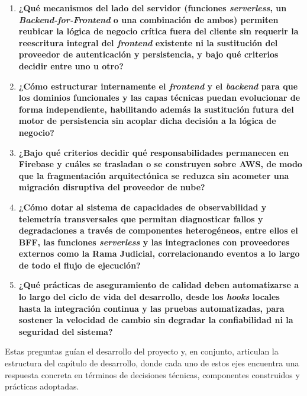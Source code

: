 \begin{enumerate}
  \item \textbf{¿Qué mecanismos del lado del servidor (funciones \textit{serverless}, un \textit{Backend-for-Frontend} o una combinación de ambos) permiten reubicar la lógica de negocio crítica fuera del cliente sin requerir la reescritura integral del \textit{frontend} existente ni la sustitución del proveedor de autenticación y persistencia, y bajo qué criterios decidir entre uno u otro?}

  \item \textbf{¿Cómo estructurar internamente el \textit{frontend} y el \textit{backend} para que los dominios funcionales y las capas técnicas puedan evolucionar de forma independiente, habilitando además la sustitución futura del motor de persistencia sin acoplar dicha decisión a la lógica de negocio?}

  \item \textbf{¿Bajo qué criterios decidir qué responsabilidades permanecen en Firebase y cuáles se trasladan o se construyen sobre AWS, de modo que la fragmentación arquitectónica se reduzca sin acometer una migración disruptiva del proveedor de nube?}

  \item \textbf{¿Cómo dotar al sistema de capacidades de observabilidad y telemetría transversales que permitan diagnosticar fallos y degradaciones a través de componentes heterogéneos, entre ellos el BFF, las funciones \textit{serverless} y las integraciones con proveedores externos como la Rama Judicial, correlacionando eventos a lo largo de todo el flujo de ejecución?}

  \item \textbf{¿Qué prácticas de aseguramiento de calidad deben automatizarse a lo largo del ciclo de vida del desarrollo, desde los \textit{hooks} locales hasta la integración continua y las pruebas automatizadas, para sostener la velocidad de cambio sin degradar la confiabilidad ni la seguridad del sistema?}
\end{enumerate}

Estas preguntas guían el desarrollo del proyecto y, en conjunto, articulan la estructura del capítulo de desarrollo, donde cada uno de estos ejes encuentra una respuesta concreta en términos de decisiones técnicas, componentes construidos y prácticas adoptadas.
